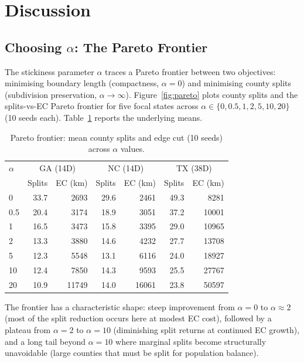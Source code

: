 \section{Discussion}
\label{sec:discussion}

\subsection{Choosing $\alpha$: The Pareto Frontier}
\label{sec:pareto}

The stickiness parameter $\alpha$ traces a Pareto frontier between two objectives:
minimising boundary length (compactness, $\alpha = 0$) and minimising county
splits (subdivision preservation, $\alpha \to \infty$).
Figure~\ref{fig:pareto} plots county splits and the splits-vs-EC Pareto frontier
for five focal states across $\alpha \in \{0, 0.5, 1, 2, 5, 10, 20\}$ (10 seeds each).
Table~\ref{tab:pareto} reports the underlying means.

\begin{table}[t]
\centering
\caption{Pareto frontier: mean county splits and edge cut (10 seeds) across $\alpha$ values.}
\label{tab:pareto}
\small
\begin{tabular}{lrrrrrr}
\toprule
$\alpha$ & \multicolumn{2}{c}{GA (14D)} & \multicolumn{2}{c}{NC (14D)} & \multicolumn{2}{c}{TX (38D)} \\
& Splits & EC (km) & Splits & EC (km) & Splits & EC (km) \\
\midrule
0    & 33.7 & 2693 & 29.6 & 2461 & 49.3 & 8281  \\
0.5  & 20.4 & 3174 & 18.9 & 3051 & 37.2 & 10001 \\
1    & 16.5 & 3473 & 15.8 & 3395 & 29.0 & 10965 \\
2    & 13.3 & 3880 & 14.6 & 4232 & 27.7 & 13708 \\
5    & 12.3 & 5548 & 13.1 & 6116 & 24.0 & 18927 \\
10   & 12.4 & 7850 & 14.3 & 9593 & 25.5 & 27767 \\
20   & 10.9 & 11749 & 14.0 & 16061 & 23.8 & 50597 \\
\bottomrule
\end{tabular}
\end{table}

The frontier has a characteristic shape: steep improvement from $\alpha = 0$ to
$\alpha \approx 2$ (most of the split reduction occurs here at modest EC cost),
followed by a plateau from $\alpha = 2$ to $\alpha = 10$ (diminishing split returns
at continued EC growth), and a long tail beyond $\alpha = 10$ where marginal splits
become structurally unavoidable (large counties that must be split for population balance).

